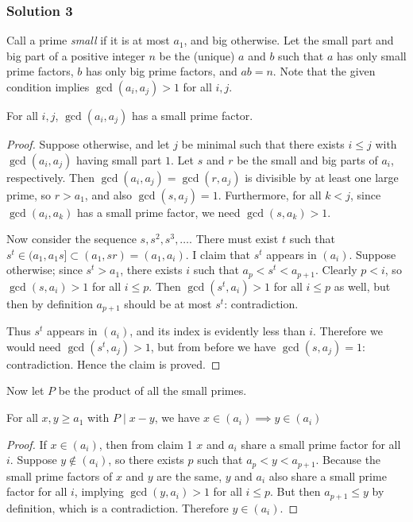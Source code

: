 \documentclass[11pt]{article}
\begin{document}
\subsubsection{Solution 3}
Call a prime \textit{small} if it is at most $a_1$, and big otherwise. Let the small part and big part of a positive integer $n$ be the (unique) $a$ and $b$ such that $a$ has only small prime factors, $b$ has only big prime factors, and $ab=n$. Note that the given condition implies $\gcd(a_i,a_j)>1$ for all $i,j$.
\begin{claim}
    For all $i,j$, $\gcd(a_i,a_j)$ has a small prime factor.
\end{claim}
\begin{proof}
    Suppose otherwise, and let $j$ be minimal such that there exists $i\leq j$ with $\gcd(a_i,a_j)$ having small part $1$. Let $s$ and $r$ be the small and big parts of $a_i$, respectively. Then $\gcd(a_i,a_j)=\gcd(r,a_j)$ is divisible by at least one large prime, so $r>a_1$, and also $\gcd(s,a_j)=1$. Furthermore, for all $k<j$, since $\gcd(a_i,a_k)$ has a small prime factor, we need $\gcd(s,a_k)>1$.

\medskip
Now consider the sequence $s,s^2,s^3,\ldots$. There must exist $t$ such that $s^t \in (a_1,a_1s] \subset (a_1,sr)=(a_1,a_i)$. I claim that $s^t$ appears in $(a_i)$. Suppose otherwise; since $s^t>a_1$, there exists $i$ such that $a_p<s^t<a_{p+1}$. Clearly $p<i$, so $\gcd(s,a_i)>1$ for all $i \leq p$. Then $\gcd(s^t,a_i)>1$ for all $i \leq p$ as well, but then by definition $a_{p+1}$ should be at most $s^t$: contradiction.

\medskip
Thus $s^t$ appears in $(a_i)$, and its index is evidently less than $i$. Therefore we would need $\gcd(s^t,a_j)>1$, but from before we have $\gcd(s,a_j)=1$: contradiction. Hence the claim is proved.
\end{proof}
\noindent
Now let $P$ be the product of all the small primes.
\begin{claim}
    For all $x,y \geq a_1$ with $P \mid x-y$, we have $x \in (a_i) \implies y \in (a_i)$
\end{claim}
\begin{proof}
    If $x \in (a_i)$, then from claim 1 $x$ and $a_i$ share a small prime factor for all $i$. Suppose $y \not \in (a_i)$, so there exists $p$ such that $a_p<y<a_{p+1}$. Because the small prime factors of $x$ and $y$ are the same, $y$ and $a_i$ also share a small prime factor for all $i$, implying $\gcd(y,a_i)>1$ for all $i \leq p$. But then $a_{p+1} \leq y$ by definition, which is a contradiction. Therefore $y \in (a_i)$. 
\end{proof}
\end{document}

